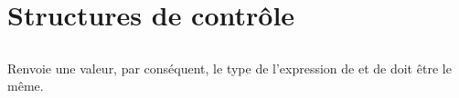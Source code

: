 \section{Structures de contrôle}
\label{sec:conditionals}

\subsection{ }

Renvoie une valeur, par conséquent, le type de l'expression de  et de  doit être le même.

\subsection{ }

